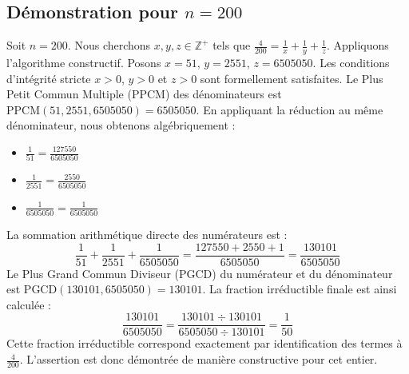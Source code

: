 \documentclass[11pt,a4paper]{article}
\begin{document}
\subsection{Démonstration pour $n = 200$}
Soit $n = 200$. Nous cherchons $x, y, z \in \mathbb{Z}^{+}$ tels que $\frac{4}{200} = \frac{1}{x} + \frac{1}{y} + \frac{1}{z}$.
Appliquons l'algorithme constructif. Posons $x = 51$, $y = 2551$, $z = 6505050$.
Les conditions d'intégrité stricte $x > 0$, $y > 0$ et $z > 0$ sont formellement satisfaites.
Le Plus Petit Commun Multiple (PPCM) des dénominateurs est $\text{PPCM}(51, 2551, 6505050) = 6505050$.
En appliquant la réduction au même dénominateur, nous obtenons algébriquement :
\begin{itemize}
    \item $\frac{1}{51} = \frac{127550}{6505050}$
    \item $\frac{1}{2551} = \frac{2550}{6505050}$
    \item $\frac{1}{6505050} = \frac{1}{6505050}$
\end{itemize}
La sommation arithmétique directe des numérateurs est :
$$ \frac{1}{51} + \frac{1}{2551} + \frac{1}{6505050} = \frac{127550 + 2550 + 1}{6505050} = \frac{130101}{6505050} $$
Le Plus Grand Commun Diviseur (PGCD) du numérateur et du dénominateur est $\text{PGCD}(130101, 6505050) = 130101$.
La fraction irréductible finale est ainsi calculée :
$$ \frac{130101}{6505050} = \frac{130101 \div 130101}{6505050 \div 130101} = \frac{1}{50} $$
Cette fraction irréductible correspond exactement par identification des termes à $\frac{4}{200}$. L'assertion est donc démontrée de manière constructive pour cet entier.
\end{document}
